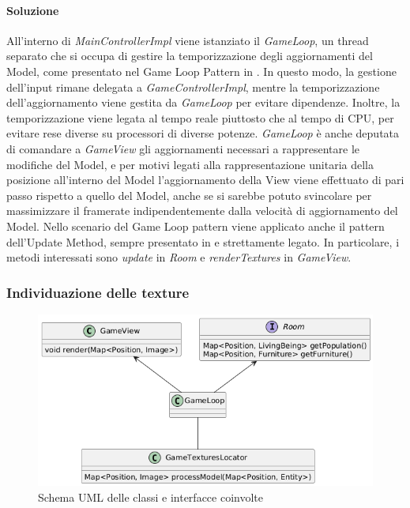 \documentclass[a4paper,12pt]{report}
\begin{document}
\paragraph{Soluzione} All'interno di \textit{MainControllerImpl} viene istanziato il \textit{GameLoop}, un thread separato che si occupa di gestire la temporizzazione degli aggiornamenti del Model, come presentato nel Game Loop Pattern in \cite{nystrom2014}. In questo modo, la gestione dell'input rimane delegata a \textit{GameControllerImpl}, mentre la temporizzazione dell'aggiornamento viene gestita da \textit{GameLoop} per evitare dipendenze. Inoltre, la temporizzazione viene legata al tempo reale piuttosto che al tempo di CPU, per evitare rese diverse su processori di diverse potenze. \textit{GameLoop} è anche deputata di comandare a \textit{GameView} gli aggiornamenti necessari a rappresentare le modifiche del Model, e per motivi legati alla rappresentazione unitaria della posizione all'interno del Model l'aggiornamento della View viene effettuato di pari passo rispetto a quello del Model, anche se si sarebbe potuto svincolare per massimizzare il framerate indipendentemente dalla velocità di aggiornamento del Model. 
\newline Nello scenario del Game Loop pattern viene applicato anche il pattern dell'Update Method, sempre presentato in \cite{nystrom2014} e strettamente legato. In particolare, i metodi interessati sono \textit{update} in \textit{Room} e \textit{renderTextures} in \textit{GameView}.

\subsubsection{Individuazione delle texture}
\begin{figure}[H]
	\centering
	\includegraphics[width=\textwidth]{img/locator-game.png}
	\caption{Schema UML delle classi e interfacce coinvolte}
	\label{img:locator-game}
\end{figure}
\end{document}
